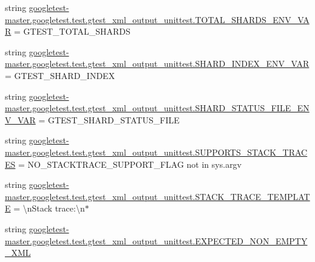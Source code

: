 \begin{DoxyCompactItemize}
\item 
string \mbox{\hyperlink{namespacegoogletest-master_1_1googletest_1_1test_1_1gtest__xml__output__unittest_ae8477ef1bc1a654973f9b508fdfcf51e}{googletest-\/master.\+googletest.\+test.\+gtest\+\_\+xml\+\_\+output\+\_\+unittest.\+T\+O\+T\+A\+L\+\_\+\+S\+H\+A\+R\+D\+S\+\_\+\+E\+N\+V\+\_\+\+V\+AR}} = \textquotesingle{}G\+T\+E\+S\+T\+\_\+\+T\+O\+T\+A\+L\+\_\+\+S\+H\+A\+R\+DS\textquotesingle{}
\item 
string \mbox{\hyperlink{namespacegoogletest-master_1_1googletest_1_1test_1_1gtest__xml__output__unittest_aedaeffda3481ad0782d1aee74aa2731c}{googletest-\/master.\+googletest.\+test.\+gtest\+\_\+xml\+\_\+output\+\_\+unittest.\+S\+H\+A\+R\+D\+\_\+\+I\+N\+D\+E\+X\+\_\+\+E\+N\+V\+\_\+\+V\+AR}} = \textquotesingle{}G\+T\+E\+S\+T\+\_\+\+S\+H\+A\+R\+D\+\_\+\+I\+N\+D\+EX\textquotesingle{}
\item 
string \mbox{\hyperlink{namespacegoogletest-master_1_1googletest_1_1test_1_1gtest__xml__output__unittest_aef45ea57afd8409724b9fc4a90c4c2e1}{googletest-\/master.\+googletest.\+test.\+gtest\+\_\+xml\+\_\+output\+\_\+unittest.\+S\+H\+A\+R\+D\+\_\+\+S\+T\+A\+T\+U\+S\+\_\+\+F\+I\+L\+E\+\_\+\+E\+N\+V\+\_\+\+V\+AR}} = \textquotesingle{}G\+T\+E\+S\+T\+\_\+\+S\+H\+A\+R\+D\+\_\+\+S\+T\+A\+T\+U\+S\+\_\+\+F\+I\+LE\textquotesingle{}
\item 
string \mbox{\hyperlink{namespacegoogletest-master_1_1googletest_1_1test_1_1gtest__xml__output__unittest_aa44d6530c43e3f1430441ff7fb9c086c}{googletest-\/master.\+googletest.\+test.\+gtest\+\_\+xml\+\_\+output\+\_\+unittest.\+S\+U\+P\+P\+O\+R\+T\+S\+\_\+\+S\+T\+A\+C\+K\+\_\+\+T\+R\+A\+C\+ES}} = N\+O\+\_\+\+S\+T\+A\+C\+K\+T\+R\+A\+C\+E\+\_\+\+S\+U\+P\+P\+O\+R\+T\+\_\+\+F\+L\+AG not in sys.\+argv
\item 
string \mbox{\hyperlink{namespacegoogletest-master_1_1googletest_1_1test_1_1gtest__xml__output__unittest_af113a7bbc386f077b39904698cdc719f}{googletest-\/master.\+googletest.\+test.\+gtest\+\_\+xml\+\_\+output\+\_\+unittest.\+S\+T\+A\+C\+K\+\_\+\+T\+R\+A\+C\+E\+\_\+\+T\+E\+M\+P\+L\+A\+TE}} = \textquotesingle{}\textbackslash{}n\+Stack trace\+:\textbackslash{}n$\ast$\textquotesingle{}
\item 
string \mbox{\hyperlink{namespacegoogletest-master_1_1googletest_1_1test_1_1gtest__xml__output__unittest_a73b117a830696d35d8141e5bc6bc6a46}{googletest-\/master.\+googletest.\+test.\+gtest\+\_\+xml\+\_\+output\+\_\+unittest.\+E\+X\+P\+E\+C\+T\+E\+D\+\_\+\+N\+O\+N\+\_\+\+E\+M\+P\+T\+Y\+\_\+\+X\+ML}}
\item 

\end{DoxyCompactItemize}
